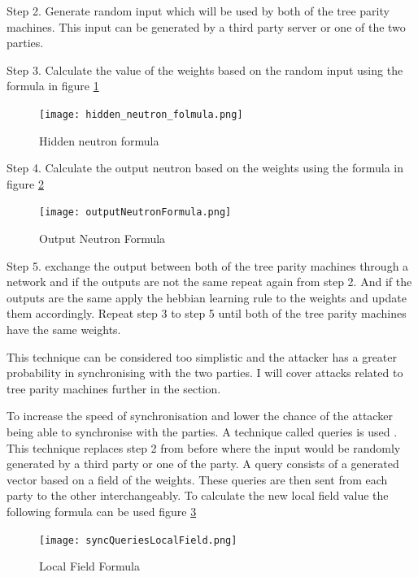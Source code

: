 Step 2. Generate random input which will be used by both of the tree parity machines. This input can be generated by a third party server or one of the two parties.

Step 3. Calculate the value of the weights based on the random input using the formula in figure \ref{fig:hiddenNeutronFormula}

\begin{figure}[ht]
  \centering
      \texttt{[image: hidden\_neutron\_folmula.png]}
  \caption[Hidden neutron formula]{Hidden neutron formula\cite{Genetic_Key_Guided_Neural_Deep_Learning_based_Encryption}}
  \label{fig:hiddenNeutronFormula}
\end{figure}

Step 4. Calculate the output neutron based on the weights using the formula in figure \ref{fig:outputNeutronFormula}

\begin{figure}[ht]
  \centering
      \texttt{[image: outputNeutronFormula.png]}
  \caption[Output Neutron Formula]{Output Neutron Formula\cite{Genetic_Key_Guided_Neural_Deep_Learning_based_Encryption}}
  \label{fig:outputNeutronFormula}
\end{figure}

Step 5. exchange the output between both of the tree parity machines through a network and if the outputs are not the same repeat again from step 2. And if the outputs are the same apply the hebbian learning rule to the weights and update them accordingly. Repeat step 3 to step 5 until both of the tree parity machines have the same weights.

This technique can be considered too simplistic and the attacker has a greater probability in synchronising with the two parties. I will cover attacks related to tree parity machines further in the section.

To increase the speed of synchronisation and lower the chance of the attacker being able to synchronise with the parties. A technique called queries is used \cite{Private_Inputs_to_Tree_Parity_Machine}.
This technique replaces step 2 from before where the input would be randomly generated by a third party or one of the party. A query consists of a generated vector based on a field of the weights. These queries are then sent from each party to the other interchangeably. 
To calculate the new local field value the following formula can be used figure \ref{fig:LocalFieldFormula}
\begin{figure}[ht]
  \centering
      \texttt{[image: syncQueriesLocalField.png]}
  \caption[Local Field Formula]{Local Field Formula\cite{Private_Inputs_to_Tree_Parity_Machine}}
  \label{fig:LocalFieldFormula}
\end{figure}

